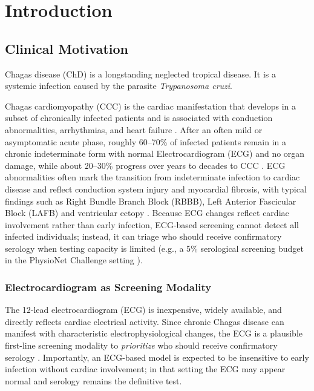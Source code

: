 \chapter{Introduction}

\section{Clinical Motivation}
Chagas disease (ChD) is a longstanding neglected tropical disease.
It is a systemic infection caused by the parasite \textit{Trypanosoma cruzi}.

Chagas cardiomyopathy (CCC) is the cardiac manifestation that develops in a subset of chronically infected patients and is associated with conduction abnormalities, arrhythmias, and heart failure \parencite{chagas_progression_2022,chagas_review_lancet_2024,chagas_ecg_abnormalities_2018}.
After an often mild or asymptomatic acute phase, roughly 60--70\% of infected patients remain in a chronic indeterminate form with normal Electrocardiogram (ECG) and no organ damage, while about 20--30\% progress over years to decades to CCC \parencite{chagas_progression_2022,chagas_review_lancet_2024}.
ECG abnormalities often mark the transition from indeterminate infection to cardiac disease and reflect conduction system injury and myocardial fibrosis, with typical findings such as Right Bundle Branch Block (RBBB), Left Anterior Fascicular Block (LAFB) and ventricular ectopy \parencite{chagas_ecg_abnormalities_2018,lancet_clinical_chagas_features_2024}.
Because ECG changes reflect cardiac involvement rather than early infection, ECG-based screening cannot detect all infected individuals; instead, it can triage who should receive confirmatory serology when testing capacity is limited (e.g., a 5\% serological screening budget in the PhysioNet Challenge setting \parencite{2025ChallengeCinC}).

\subsection*{Electrocardiogram as Screening Modality}
The 12-lead electrocardiogram (ECG) is inexpensive, widely available, and directly reflects cardiac electrical activity.
Since chronic Chagas disease can manifest with characteristic electrophysiological changes, the ECG is a plausible first-line screening modality to \emph{prioritize} who should receive confirmatory serology \parencite{jidling_screening_2023}.
Importantly, an ECG-based model is expected to be insensitive to early infection without cardiac involvement; in that setting the ECG may appear normal and serology remains the definitive test.

